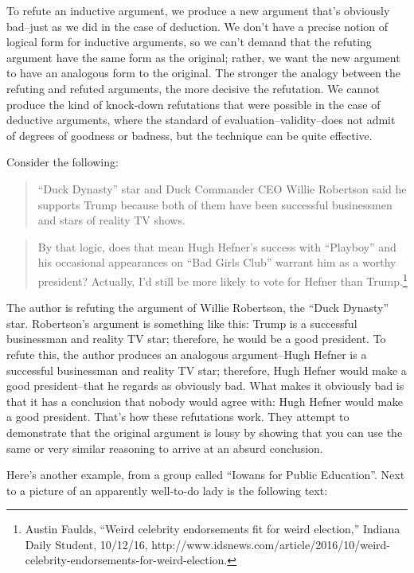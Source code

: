 To refute an inductive argument, we produce a new argument that's obviously bad--just as we did
in the case of deduction. We don't have a precise notion of logical form for inductive arguments,
so we can't demand that the refuting argument have the same form as the original; rather, we want
the new argument to have an analogous form to the original. The stronger the analogy between
the refuting and refuted arguments, the more decisive the refutation. We cannot produce the kind
of knock-down refutations that were possible in the case of deductive arguments, where the
standard of evaluation--validity--does not admit of degrees of goodness or badness, but the
technique can be quite effective.

Consider the following:

\begin{quote}``Duck Dynasty'' star and Duck Commander CEO Willie Robertson said he supports Trump
because both of them have been successful businessmen and stars of reality TV shows. \\
\end{quote}

\begin{quote}By that logic, does that mean Hugh Hefner's success with ``Playboy'' and his occasional
appearances on ``Bad Girls Club'' warrant him as a worthy president? Actually, I'd still be
more likely to vote for Hefner than 
Trump.\footnote{Austin Faulds, ``Weird celebrity endorsements fit for weird election,'' Indiana Daily Student, 10/12/16,
http://www.idsnews.com/article/2016/10/weird-celebrity-endorsements-for-weird-election.}
\end{quote}


The author is refuting the argument of Willie Robertson, the ``Duck Dynasty'' star. Robertson's
argument is something like this: Trump is a successful businessman and reality TV star; therefore,
he would be a good president. To refute this, the author produces an analogous argument--Hugh
Hefner is a successful businessman and reality TV star; therefore, Hugh Hefner would make a
good president--that he regards as obviously bad. What makes it obviously bad is that it has a
conclusion that nobody would agree with: Hugh Hefner would make a good president. That's how
these refutations work. They attempt to demonstrate that the original argument is lousy by showing
that you can use the same or very similar reasoning to arrive at an absurd conclusion.

Here's another example, from a group called ``Iowans for Public Education''. Next to a picture of
an apparently well-to-do lady is the following text:

